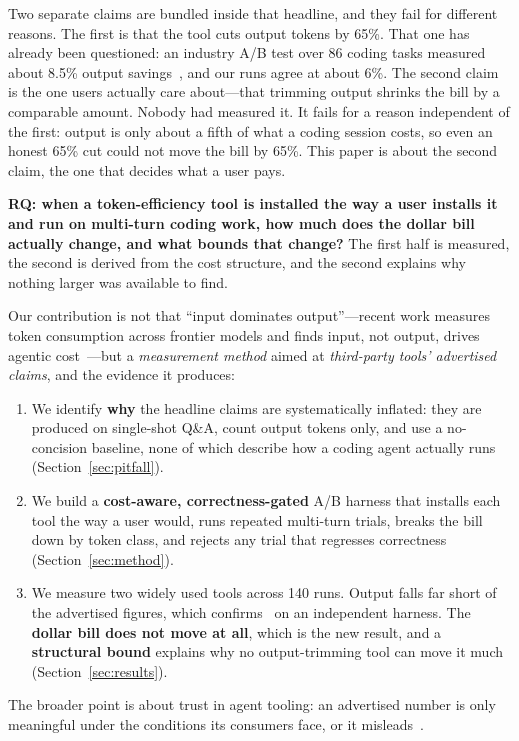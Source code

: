 Two separate claims are bundled inside that headline, and they fail for different reasons. The first
is that the tool cuts output tokens by 65\%. That one has already been questioned: an industry A/B
test over 86 coding tasks measured about 8.5\% output savings~\cite{jetbrains2026caveman}, and our
runs agree at about 6\%. The second claim is the one users actually care about---that trimming output
shrinks the bill by a comparable amount. Nobody had measured it. It fails for a reason independent of
the first: output is only about a fifth of what a coding session costs, so even an honest 65\% cut
could not move the bill by 65\%. This paper is about the second claim, the one that decides what a user pays.

\textbf{RQ: when a token-efficiency tool is installed the
way a user installs it and run on multi-turn coding work, how much does the dollar bill actually
change, and what bounds that change?} The first half is measured, the second is derived from the cost
structure, and the second explains why nothing larger was available to find.

Our contribution is not that ``input dominates output''---recent work measures token consumption
across frontier models and finds input, not output, drives agentic cost~\cite{bai2026spend}---but a
\emph{measurement method} aimed at \emph{third-party tools' advertised claims}, and the evidence it produces:
\begin{enumerate}
  \item We identify \textbf{why} the headline claims are systematically inflated: they are produced
  on single-shot Q\&A, count output tokens only, and use a no-concision baseline, none of which
  describe how a coding agent actually runs (Section~\ref{sec:pitfall}).
  \item We build a \textbf{cost-aware, correctness-gated} A/B harness that installs each tool the way
  a user would, runs repeated multi-turn trials, breaks the bill down by token class, and rejects any
  trial that regresses correctness (Section~\ref{sec:method}).
  \item We measure two widely used tools across 140 runs. Output falls far short of the advertised
  figures, which confirms~\cite{jetbrains2026caveman} on an independent harness. The \textbf{dollar
  bill does not move at all}, which is the new result, and a \textbf{structural bound} explains why no
  output-trimming tool can move it much (Section~\ref{sec:results}).
\end{enumerate}
The broader point is about trust in agent tooling: an advertised number is only meaningful under
the conditions its consumers face, or it misleads~\cite{raji2021benchmark,jacobs2021measurement}.

